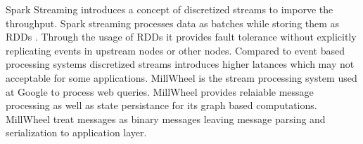Spark Streaming \cite{boyd2011distributed} introduces a concept of discretized streams to imporve the throughput. Spark streaming processes data as batches while storing them as RDDs \cite{agarwal2011reliable}. Through the usage of RDDs\cite{agarwal2011reliable} it provides fault tolerance without explicitly replicating events in upstream nodes or other nodes. Compared to event based processing systems discretized streams introduces higher latances which may not acceptable for some applications. MillWheel\cite{zaharia2013discretized} is the stream processing system used at Google to process web queries. MillWheel provides relaiable message processing as well as state persistance for its graph based computations. MillWheel treat messages as binary messages leaving message parsing and serialization to application layer. 
